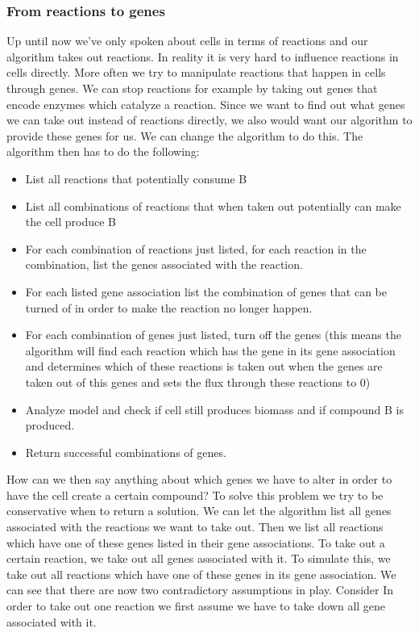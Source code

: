 \documentclass[12pt]{report}
\begin{document}
\subsubsection{From reactions to genes}
Up until now we've only spoken about cells in terms of reactions and our algorithm takes out reactions. In reality it is very hard to influence reactions in cells directly.
More often we try to manipulate reactions that happen in cells through genes.
We can stop reactions for example by taking out genes that encode enzymes which catalyze a reaction.
Since we want to find out what genes we can take out instead of reactions directly, we also would want our algorithm to provide these genes for us.
We can change the algorithm to do this.
The algorithm then has to do the following:
\begin{itemize}
\item List all reactions that potentially consume B
\item List all combinations of reactions that when taken out potentially can make the cell produce B
\item For each combination of reactions just listed, for each reaction in the combination, list the genes associated with the reaction.
\item For each listed gene association list the combination of genes that can be turned of in order to make the reaction no longer happen.
\item For each combination of genes just listed, turn off the genes (this means the algorithm will find each reaction which has the gene in its gene association and determines which of these reactions is taken out when the genes are taken out of this genes and sets the flux through these reactions to 0)
\item Analyze model and check if cell still produces biomass and if compound B is produced.
\item Return successful combinations of genes.
\end{itemize}

How can we then say anything about which genes we have to alter in order to have the cell create a certain compound?
To solve this problem we try to be conservative when to return a solution. We can let the algorithm list all genes associated with the reactions we want to take out. Then we list all reactions which have one of these genes listed in their gene associations. To take out a certain reaction, we take out all genes associated with it. To simulate this, we take out all reactions which have one of these genes in its gene association. We can see that there are now two contradictory assumptions in play. Consider  In order to take out one reaction we first assume we have to take down all gene associated with it.
\end{document}
